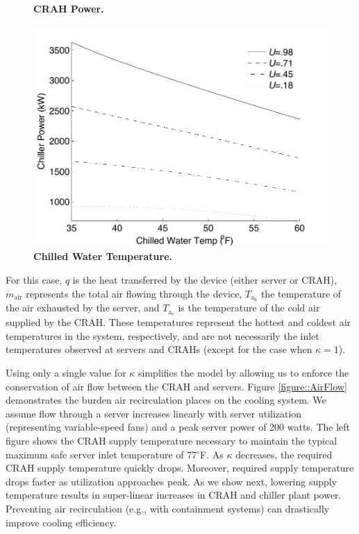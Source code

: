 \begin{figure}[ht]
\begin{minipage}[b]{0.5\linewidth}
  \caption{ \textbf{ CRAH Power. } }
  \label{figure::CRAH}
\end{minipage}
\begin{minipage}[b]{0.5\linewidth}
  \centering
 \includegraphics[width = \linewidth]{Appendices/WEED/figure/ChillerCHWSvaryQ.pdf}
   \caption{ \textbf{ Chilled Water Temperature.} }
  \label{figure::ChillerA}
\end{minipage}

\end{figure}
For this case, $q$ is the heat transferred by the device (either server or CRAH), $\dot{m}_{\mathrm{air}}$ represents the total air flowing through the device, $T_{\mathrm{a}_{\mathrm{h}}}$ the temperature of the air exhausted by the server, and $T_{\mathrm{a}_{\mathrm{c}}}$ is the temperature of the cold air supplied by the CRAH.  These temperatures represent the hottest and coldest air temperatures in the system, respectively, and are not necessarily the inlet temperatures observed at servers and CRAHs (except for the case when $\kappa = 1$).

Using only a single value for $\kappa$ simplifies the model by allowing us to enforce the conservation of air flow between the CRAH and servers.
Figure \ref{figure::AirFlow} demonstrates the burden air recirculation places on the cooling system. We assume flow through a server increases linearly with server utilization (representing variable-speed fans) and a peak server power of 200 watts.
The left figure shows the CRAH supply temperature necessary to maintain the typical maximum safe server inlet temperature of 77$^{\circ}$F.  As $\kappa$ decreases, the required CRAH supply temperature quickly drops.  Moreover, required supply temperature drops faster as utilization approaches peak.  As we show next, lowering supply temperature results in super-linear increases in CRAH and chiller plant power.
Preventing air recirculation (e.g., with containment systems) can drastically improve cooling efficiency.

